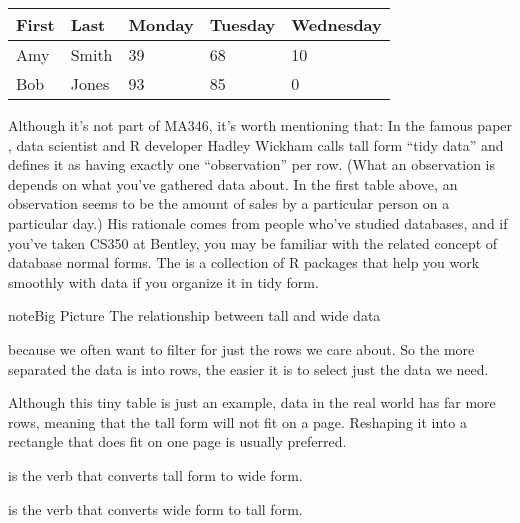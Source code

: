 \documentclass[letterpaper,10pt,english]{sphinxmanual}
\begin{document}


\begin{savenotes}\sphinxattablestart
\centering
\begin{tabulary}{\linewidth}[t]{|T|T|T|T|T|}
\hline
\sphinxstyletheadfamily 
First
&\sphinxstyletheadfamily 
Last
&\sphinxstyletheadfamily 
Monday
&\sphinxstyletheadfamily 
Tuesday
&\sphinxstyletheadfamily 
Wednesday
\\
\hline
Amy
&
Smith
&
39
&
68
&
10
\\
\hline
Bob
&
Jones
&
93
&
85
&
0
\\
\hline
\end{tabulary}
\par
\sphinxattableend\end{savenotes}

Although it’s not part of MA346, it’s worth mentioning that: In the famous paper , data scientist and R developer Hadley Wickham calls tall form “tidy data” and defines it as having exactly one “observation” per row.  (What an observation is depends on what you’ve gathered data about.  In the first table above, an observation seems to be the amount of sales by a particular person on a particular day.)  His rationale comes from people who’ve studied databases, and if you’ve taken CS350 at Bentley, you may be familiar with the related concept of database normal forms.  The  is a collection of R packages that help you work smoothly with data if you organize it in tidy form.

\begin{sphinxadmonition}{note}{Big Picture \sphinxhyphen{} The relationship between tall and wide data}

 because we often want to filter for just the rows we care about.  So the more separated the data is into rows, the easier it is to select just the data we need.

  Although this tiny table is just an example, data in the real world has far more rows, meaning that the tall form will not fit on a page.  Reshaping it into a rectangle that does fit on one page is usually preferred.

 is the verb that converts tall form to wide form.

 is the verb that converts wide form to tall form.
\end{sphinxadmonition}
\end{document}
